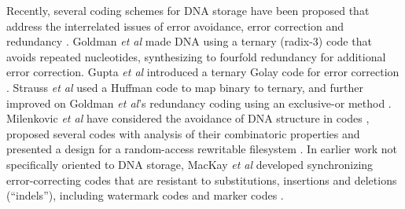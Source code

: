 \documentclass[english]{article}
\begin{document}
Recently, several coding schemes for DNA storage have been proposed
that address the interrelated issues of error avoidance, error correction and redundancy
\cite{GoldmanEtAl2013,MilenkovicEtAl2005,YazdiEtAl2015,GuptaEtAl2015,MilenkovicEtAl2014,MilenkovicEtAl2015,GabrysEtAl2015,MilenkovicEtAl2016,BornholtEtAl2016}.
Goldman {\em et al} \cite{GoldmanEtAl2013} made DNA using a ternary (radix-3) code that avoids repeated nucleotides,
synthesizing to fourfold redundancy for additional error correction.
Gupta {\em et al} introduced a ternary Golay code for error correction \cite{GuptaEtAl2015}.
Strauss {\em et al} used a Huffman code to map binary to ternary, and further improved on Goldman {\em et al}'s redundancy coding using an exclusive-or method \cite{BornholtEtAl2016}.
Milenkovic {\em et al} have considered
the avoidance of DNA structure in codes \cite{MilenkovicEtAl2005},
proposed several codes with analysis of their combinatoric properties \cite{MilenkovicEtAl2014,MilenkovicEtAl2015,GabrysEtAl2015,MilenkovicEtAl2016}
and presented a design for a random-access rewritable filesystem \cite{YazdiEtAl2015}.
In earlier work not specifically oriented to DNA storage,
MacKay {\em et al} developed synchronizing error-correcting codes that are resistant to
substitutions, insertions and deletions (``indels''),
including watermark codes \cite{DaveyMackay2000,DaveyMackay2001}
and marker codes \cite{RatzerMackay2000}.
\end{document}
